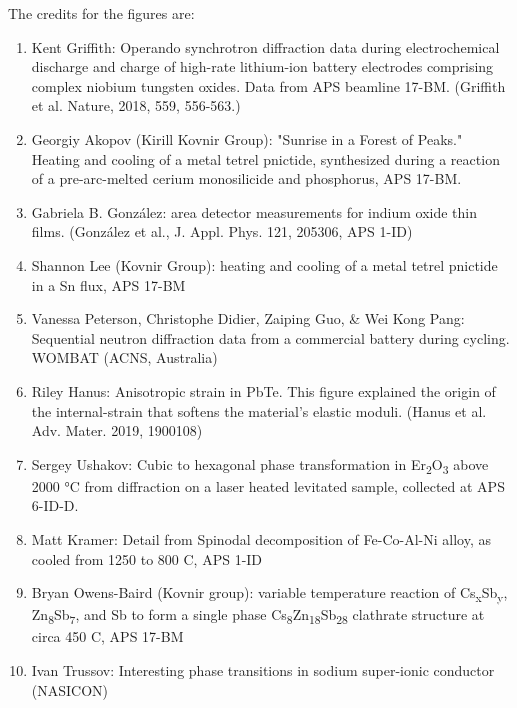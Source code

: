 \vspace{\baselineskip}\noindent The credits for the figures are:
\begin{enumerate}
    \item 
Kent Griffith: Operando synchrotron diffraction data during electrochemical discharge and charge of high-rate lithium-ion battery electrodes comprising complex niobium tungsten oxides. Data from APS beamline 17-BM. (Griffith et al. Nature, 2018, 559, 556-563.)

    \item 
Georgiy Akopov (Kirill Kovnir Group): "Sunrise in a Forest of Peaks." Heating and cooling of a metal tetrel pnictide, synthesized during a reaction of a pre-arc-melted cerium monosilicide and phosphorus, APS 17-BM.

    \item 
Gabriela B. Gonz\'{a}lez: area detector measurements for indium oxide thin films. (Gonz\'{a}lez et al., J. Appl. Phys. 121, 205306, APS 1-ID)

    \item 
Shannon Lee (Kovnir Group): heating and cooling of a metal tetrel pnictide in a Sn flux, APS 17-BM 

    \item 
Vanessa Peterson, Christophe Didier, Zaiping Guo, \& Wei Kong Pang: Sequential neutron diffraction data from a commercial battery during cycling. WOMBAT (ACNS, Australia)

    \item 
Riley Hanus: Anisotropic strain in PbTe. This figure explained the origin of the internal-strain that softens the material’s elastic moduli. (Hanus et al. Adv. Mater. 2019, 1900108)

    \item 
Sergey Ushakov: Cubic to hexagonal phase transformation in Er\textsubscript{2}O\textsubscript{3} above 2000 °C from diffraction on a laser heated levitated sample, collected at APS 6-ID-D.

    \item 
Matt Kramer: Detail from Spinodal decomposition of Fe-Co-Al-Ni alloy, as cooled from 1250 to 800 C, APS 1-ID

    \item 
Bryan Owens-Baird (Kovnir group): variable temperature reaction of Cs\textsubscript{x}Sb\textsubscript{y}, Zn\textsubscript{8}Sb\textsubscript{7}, and Sb to form a single phase Cs\textsubscript{8}Zn\textsubscript{18}Sb\textsubscript{28} clathrate structure at circa 450 C, APS 17-BM 

    \item 
Ivan Trussov: Interesting phase transitions in sodium super-ionic conductor (NASICON)
\end{enumerate}

